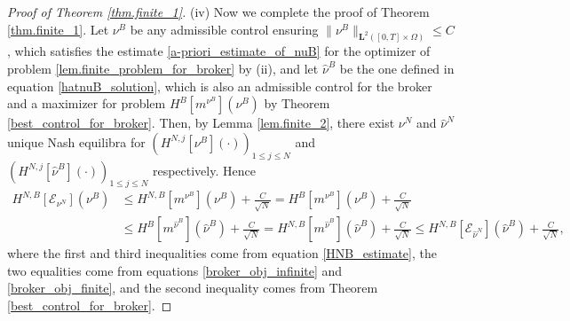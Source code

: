 \documentclass[10pt,a4paper]{amsart}
\begin{document}
\begin{proof}[Proof of Theorem \ref{thm.finite_1}]
    (iv) Now we complete the proof of Theorem \ref{thm.finite_1}. Let $\nu^B$ be any admissible control ensuring $\|\nu^B\|_{\mathbf{L}^2([0,T] \times \Omega)} \leq C$, which satisfies the estimate \eqref{a-priori_estimate_of_nuB} for the optimizer of problem \eqref{lem.finite_problem_for_broker} by (ii), and let $\hat \nu^B$ be the one defined in equation \eqref{hatnuB_solution}, which is also an admissible control for the broker and a maximizer for problem $H^{B}[m^{\nu^B}] (\nu^B)$ by Theorem \ref{best_control_for_broker}. Then, by Lemma \ref{lem.finite_2}, there exist $\nu^N$ and $\hat \nu^N$ unique Nash equilibra for $(H^{N,j}[\nu^B](\cdot))_{1 \leq j \leq N}$ and $(H^{N,j}[\hat \nu^B](\cdot))_{1 \leq j \leq N}$ respectively. Hence
    \begin{align*}
        H^{N,B}\left[\mathcal{E}_{\nu^N}\right]\left(\nu^B\right) &\leq H^{N,B}\left[m^{\nu^B}\right]\left(\nu^B\right) + \frac{C}{\sqrt{N}} = H^{B}\left[m^{\nu^B}\right]\left(\nu^B\right) + \frac{C}{\sqrt{N}} \\
        & \leq H^{B}\left[m^{\hat \nu^B}\right]\left(\hat \nu^B\right) + \frac{C}{\sqrt{N}} = H^{N,B}\left[m^{\hat \nu^B}\right]\left(\hat \nu^B\right) + \frac{C}{\sqrt{N}} \leq H^{N,B}\left[\mathcal{E}_{\hat \nu^N}\right]\left(\hat \nu^B\right) + \frac{C}{\sqrt{N}},
    \end{align*}
    where the first and third inequalities come from equation \eqref{HNB_estimate}, the two equalities come from equations \eqref{broker_obj_infinite} and \eqref{broker_obj_finite}, and the second inequality comes from Theorem \ref{best_control_for_broker}.
\end{proof}
\end{document}
